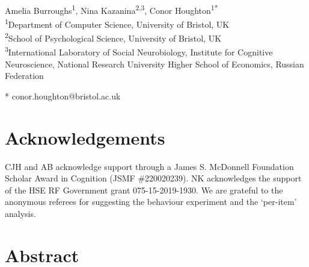 \documentclass[10pt,letterpaper]{article}
\date{}
\begin{document}
\vspace*{0.2in}

\begin{flushleft}
{\Large
\textbf{} 
}
\newline
\\
Amelia Burroughs\textsuperscript{1},
Nina Kazanina\textsuperscript{2,3},
Conor Houghton\textsuperscript{1*}
\\
\bigskip
\textsuperscript{1}Department of Computer Science, University of
Bristol, UK\\ \textsuperscript{2}School of Psychological Science,
University of Bristol, UK\\ \textsuperscript{3}International
Laboratory of Social Neurobiology, Institute for Cognitive
Neuroscience, National Research University Higher School of Economics,
Russian Federation \\
\bigskip

* conor.houghton@bristol.ac.uk

\end{flushleft}


\section*{Acknowledgements}
CJH and AB acknowledge support through a James S. McDonnell Foundation
Scholar Award in Cognition (JSMF \#220020239). NK acknowledges the
support of the HSE RF Government grant 075-15-2019-1930. We are
grateful to the anonymous referees for suggesting the behaviour
experiment and the `per-item' analysis.

\section*{Abstract}
\end{document}
